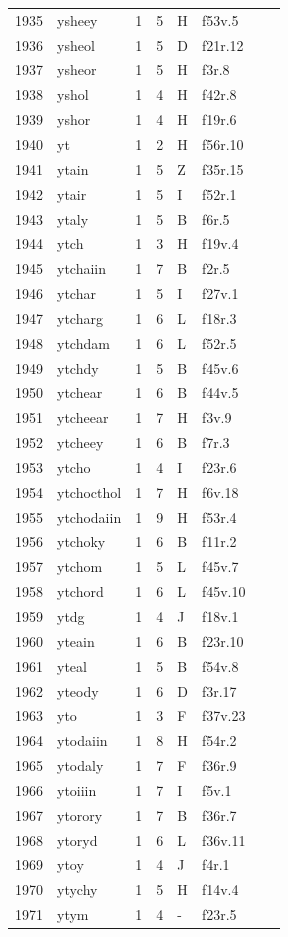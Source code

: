 \documentclass[11pt,a4paper]{article}
\begin{document}
\begin{landscape}
\begin{longtable}{@{}r>{\ttfamily}lrrl>{\ttfamily}l>{\raggedright\arraybackslash}p{80mm}>{\raggedright\arraybackslash}p{36mm}@{}}
1935 & ysheey & 1 & 5 & H & f53v.5 &  & \\
1936 & ysheol & 1 & 5 & D & f21r.12 &  & \\
1937 & ysheor & 1 & 5 & H & f3r.8 &  & \\
1938 & yshol & 1 & 4 & H & f42r.8 &  & \\
1939 & yshor & 1 & 4 & H & f19r.6 &  & \\
1940 & yt & 1 & 2 & H & f56r.10 &  & \\
1941 & ytain & 1 & 5 & Z & f35r.15 &  & \\
1942 & ytair & 1 & 5 & I & f52r.1 &  & \\
1943 & ytaly & 1 & 5 & B & f6r.5 &  & \\
1944 & ytch & 1 & 3 & H & f19v.4 &  & \\
1945 & ytchaiin & 1 & 7 & B & f2r.5 &  & \\
1946 & ytchar & 1 & 5 & I & f27v.1 &  & \\
1947 & ytcharg & 1 & 6 & L & f18r.3 &  & \\
1948 & ytchdam & 1 & 6 & L & f52r.5 &  & \\
1949 & ytchdy & 1 & 5 & B & f45v.6 &  & \\
1950 & ytchear & 1 & 6 & B & f44v.5 &  & \\
1951 & ytcheear & 1 & 7 & H & f3v.9 &  & \\
1952 & ytcheey & 1 & 6 & B & f7r.3 &  & \\
1953 & ytcho & 1 & 4 & I & f23r.6 &  & \\
1954 & ytchocthol & 1 & 7 & H & f6v.18 &  & \\
1955 & ytchodaiin & 1 & 9 & H & f53r.4 &  & \\
1956 & ytchoky & 1 & 6 & B & f11r.2 &  & \\
1957 & ytchom & 1 & 5 & L & f45v.7 &  & \\
1958 & ytchord & 1 & 6 & L & f45v.10 &  & \\
1959 & ytdg & 1 & 4 & J & f18v.1 &  & \\
1960 & yteain & 1 & 6 & B & f23r.10 &  & \\
1961 & yteal & 1 & 5 & B & f54v.8 &  & \\
1962 & yteody & 1 & 6 & D & f3r.17 &  & \\
1963 & yto & 1 & 3 & F & f37v.23 &  & \\
1964 & ytodaiin & 1 & 8 & H & f54r.2 &  & \\
1965 & ytodaly & 1 & 7 & F & f36r.9 &  & \\
1966 & ytoiiin & 1 & 7 & I & f5v.1 &  & \\
1967 & ytorory & 1 & 7 & B & f36r.7 &  & \\
1968 & ytoryd & 1 & 6 & L & f36v.11 &  & \\
1969 & ytoy & 1 & 4 & J & f4r.1 &  & \\
1970 & ytychy & 1 & 5 & H & f14v.4 &  & \\
1971 & ytym & 1 & 4 & - & f23r.5 &  & \\
\bottomrule\end{longtable}\normalsize

\end{landscape}
\end{document}
